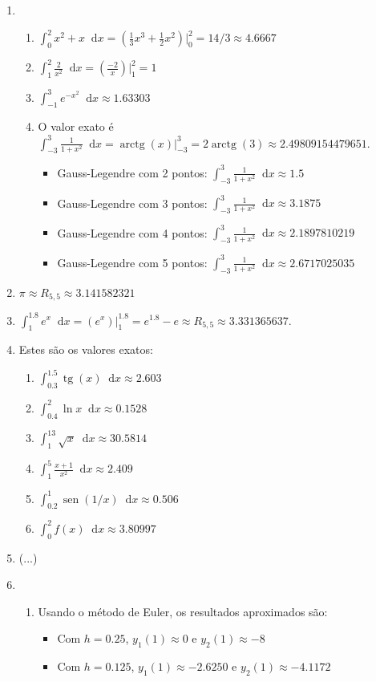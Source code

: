 \documentclass[12pt,a4paper]{article}
\newcommand{\fixme}{{\color{red}(...)}}
\newcommand*\sen{\operatorname{sen}}
\newcommand*\tg{\operatorname{tg}}
\newcommand*\arctg{\operatorname{arctg}}
\newcommand*\diff{\mathop{}\!\mathrm{d}}
\begin{document}
\begin{enumerate}
\item
\begin{enumerate}
\item $\int_0^2 x^2 + x\diff{x} = \left( \frac{1}{3}x^3 +\frac{1}{2}x^2 \right)\Big|_0^2 = 14/3 \approx 4.6667$
\item $\int_1^2 \frac{2}{x^2}\diff{x} = \left( \frac{-2}{x} \right)\Big|_1^2 = 1$
\item $\int_{-1}^3 e^{-x^2}\diff{x} \approx 1.63303$
\item O valor exato é $\int_{-3}^3 \frac{1}{1+x^2} \diff{x} = \arctg(x) \Big|_{-3}^3 = 2 \arctg(3) \approx 2.49809154479651$.
\begin{itemize}
\item Gauss-Legendre com 2 pontos: $\int_{-3}^3 \frac{1}{1+x^2} \diff{x} \approx 1.5$
\item Gauss-Legendre com 3 pontos: $\int_{-3}^3 \frac{1}{1+x^2} \diff{x} \approx 3.1875$
\item Gauss-Legendre com 4 pontos: $\int_{-3}^3 \frac{1}{1+x^2} \diff{x} \approx 2.1897810219$
\item Gauss-Legendre com 5 pontos: $\int_{-3}^3 \frac{1}{1+x^2} \diff{x} \approx 2.6717025035$
\end{itemize}
\end{enumerate}
\item $\pi \approx R_{5,5} \approx 3.141582321$
\item $\int_1^{1.8} e^x\diff{x}
= \left(e^x \right)\Big|_{1}^{1.8}
= e^{1.8} - e
\approx R_{5,5}
\approx 3.331365637$.
\item Estes são os valores exatos:
\begin{enumerate}
\item $\int_{0.3}^{1.5} \tg(x)\diff{x} \approx 2.603$
\item $\int_{0.4}^{2} \ln{x}\diff{x} \approx 0.1528$
\item $\int_{1}^{13} \sqrt{x}\diff{x} \approx 30.5814$
\item $\int_1^5 \frac{x+1}{x^2}\diff{x} \approx 2.409$
\item $\int_{0.2}^{1} \sen(1/x)\diff{x} \approx 0.506$
\item $\int_{0}^{2} f(x)\diff{x} \approx 3.80997$
\end{enumerate}
\item \fixme
\item \begin{enumerate}
\item Usando o método de Euler, os resultados aproximados são:
\begin{itemize}
\item Com $h=0.25$, $y_1(1) \approx 0$ e $y_2(1) \approx -8$
\item Com $h=0.125$, $y_1(1) \approx -2.6250$ e $y_2(1) \approx -4.1172$
\end{itemize}


\end{enumerate}
\end{enumerate}
\end{document}

